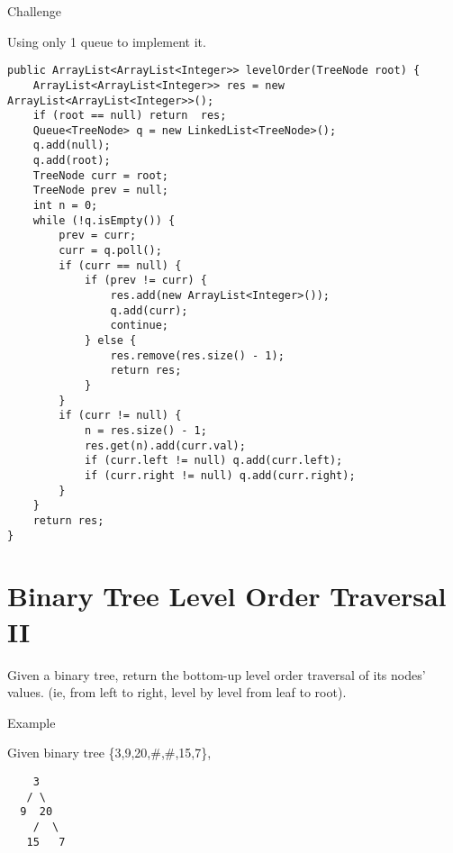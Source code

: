 \documentclass[12pt]{book}
\begin{document}
Challenge

Using only 1 queue to implement it.
\lstset{language=java,label= ,caption= ,numbers=none}
\begin{lstlisting}
public ArrayList<ArrayList<Integer>> levelOrder(TreeNode root) {
    ArrayList<ArrayList<Integer>> res = new ArrayList<ArrayList<Integer>>();
    if (root == null) return  res;
    Queue<TreeNode> q = new LinkedList<TreeNode>();
    q.add(null);
    q.add(root);
    TreeNode curr = root;
    TreeNode prev = null;
    int n = 0;
    while (!q.isEmpty()) {
        prev = curr;
        curr = q.poll();
        if (curr == null) {
            if (prev != curr) {
                res.add(new ArrayList<Integer>());
                q.add(curr);
                continue;
            } else {
                res.remove(res.size() - 1);
                return res;   
            }
        }
        if (curr != null) {
            n = res.size() - 1;
            res.get(n).add(curr.val);
            if (curr.left != null) q.add(curr.left);
            if (curr.right != null) q.add(curr.right);
        }
    }
    return res;
}
\end{lstlisting}
\chapter{Binary Tree Level Order Traversal II}
\label{sec-16}

Given a binary tree, return the bottom-up level order traversal of its nodes' values. (ie, from left to right, level by level from leaf to root).

Example

Given binary tree \{3,9,20,\#,\#,15,7\},
\lstset{language=java,label= ,caption= ,numbers=none}
\begin{lstlisting}
    3
   / \
  9  20
    /  \
   15   7
\end{lstlisting}
\end{document}

